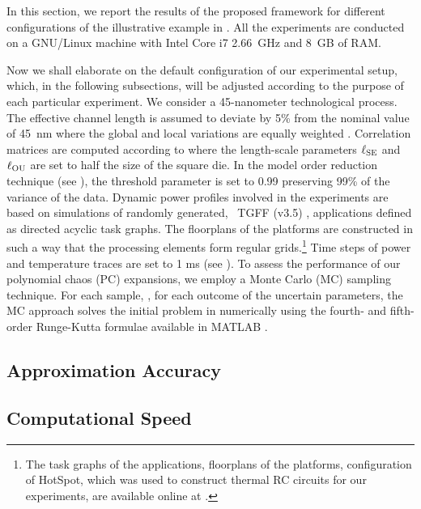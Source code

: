 
In this section, we report the results of the proposed framework for different configurations of the illustrative example in .
All the experiments are conducted on a GNU/Linux machine with Intel Core i7 2.66~GHz and 8~GB of RAM.

Now we shall elaborate on the default configuration of our experimental setup, which, in the following subsections, will be adjusted according to the purpose of each particular experiment.
We consider a 45-nanometer technological process.
The effective channel length is assumed to deviate by 5\% from the nominal value of 45~nm where the global and local variations are equally weighted \cite{juan2011, juan2012}.
Correlation matrices are computed according to  where the length-scale parameters $\ell_{\text{SE}}$ and $\ell_{\text{OU}}$ are set to half the size of the square die.
In the model order reduction technique (see ), the threshold parameter is set to 0.99 preserving 99\% of the variance of the data.
Dynamic power profiles involved in the experiments are based on simulations of randomly generated, \via\ TGFF (v3.5) \cite{dick1998}, applications defined as directed acyclic task graphs.
The floorplans of the platforms are constructed in such a way that the processing elements form regular grids.\footnote{The task graphs of the applications, floorplans of the platforms, configuration of HotSpot, which was used to construct thermal RC circuits for our experiments, are available online at \cite{sources}.}
Time steps of power and temperature traces are set to 1 ms (see ).
To assess the performance of our polynomial chaos (PC) expansions, we employ a Monte Carlo (MC) sampling technique.
For each sample, \ie, for each outcome of the uncertain parameters, the MC approach solves the initial problem in  numerically using the fourth- and fifth-order Runge-Kutta formulae \cite{press2007} available in MATLAB \cite{matlab}.

\subsection{Approximation Accuracy} 


\subsection{Computational Speed} 

